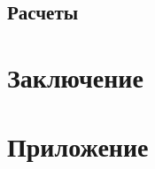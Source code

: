 \documentclass{article}
\begin{document}
\subsection{Расчеты}%


\newpage
{}
\section*{Заключение\vspace{5mm}}



\newpage
\renewcommand{\refname}{Список использованных источников}
\begin{thebibliography}{7}
	
\end{thebibliography}


\newpage
\section*{Приложение\vspace{5mm}}


 
\end{document}
